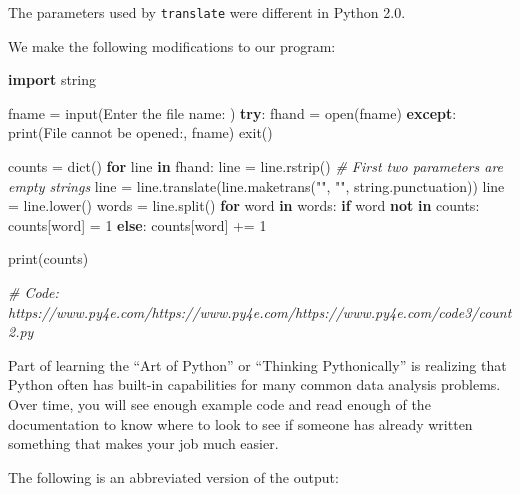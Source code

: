 \documentclass[10pt,]{book}
\newenvironment{Shaded}{}{}
\newcommand{\BuiltInTok}[1]{\textcolor[rgb]{0.00,0.50,0.00}{#1}}
\newcommand{\CommentTok}[1]{\textcolor[rgb]{0.38,0.63,0.69}{\textit{#1}}}
\newcommand{\ControlFlowTok}[1]{\textcolor[rgb]{0.00,0.44,0.13}{\textbf{#1}}}
\newcommand{\DecValTok}[1]{\textcolor[rgb]{0.25,0.63,0.44}{#1}}
\newcommand{\ImportTok}[1]{\textcolor[rgb]{0.00,0.50,0.00}{\textbf{#1}}}
\newcommand{\KeywordTok}[1]{\textcolor[rgb]{0.00,0.44,0.13}{\textbf{#1}}}
\newcommand{\NormalTok}[1]{#1}
\newcommand{\OperatorTok}[1]{\textcolor[rgb]{0.40,0.40,0.40}{#1}}
\newcommand{\StringTok}[1]{\textcolor[rgb]{0.25,0.44,0.63}{#1}}
\begin{document}
The parameters used by \texttt{translate} were different in Python 2.0.

We make the following modifications to our program:

\begin{Shaded}
\begin{Highlighting}[]
\ImportTok{import}\NormalTok{ string}

\NormalTok{fname }\OperatorTok{=} \BuiltInTok{input}\NormalTok{(}\StringTok{\textquotesingle{}Enter the file name: \textquotesingle{}}\NormalTok{)}
\ControlFlowTok{try}\NormalTok{:}
\NormalTok{    fhand }\OperatorTok{=} \BuiltInTok{open}\NormalTok{(fname)}
\ControlFlowTok{except}\NormalTok{:}
    \BuiltInTok{print}\NormalTok{(}\StringTok{\textquotesingle{}File cannot be opened:\textquotesingle{}}\NormalTok{, fname)}
\NormalTok{    exit()}

\NormalTok{counts }\OperatorTok{=} \BuiltInTok{dict}\NormalTok{()}
\ControlFlowTok{for}\NormalTok{ line }\KeywordTok{in}\NormalTok{ fhand:}
\NormalTok{    line }\OperatorTok{=}\NormalTok{ line.rstrip()}
    \CommentTok{\# First two parameters are empty strings}
\NormalTok{    line }\OperatorTok{=}\NormalTok{ line.translate(line.maketrans(}\StringTok{""}\NormalTok{, }\StringTok{""}\NormalTok{, string.punctuation))}
\NormalTok{    line }\OperatorTok{=}\NormalTok{ line.lower()}
\NormalTok{    words }\OperatorTok{=}\NormalTok{ line.split()}
    \ControlFlowTok{for}\NormalTok{ word }\KeywordTok{in}\NormalTok{ words:}
        \ControlFlowTok{if}\NormalTok{ word }\KeywordTok{not} \KeywordTok{in}\NormalTok{ counts:}
\NormalTok{            counts[word] }\OperatorTok{=} \DecValTok{1}
        \ControlFlowTok{else}\NormalTok{:}
\NormalTok{            counts[word] }\OperatorTok{+=} \DecValTok{1}

\BuiltInTok{print}\NormalTok{(counts)}

\CommentTok{\# Code: https://www.py4e.com/https://www.py4e.com/https://www.py4e.com/code3/count2.py}
\end{Highlighting}
\end{Shaded}


Part of learning the ``Art of Python'' or ``Thinking Pythonically'' is
realizing that Python often has built-in capabilities for many common
data analysis problems. Over time, you will see enough example code and
read enough of the documentation to know where to look to see if someone
has already written something that makes your job much easier.

The following is an abbreviated version of the output:
\end{document}
